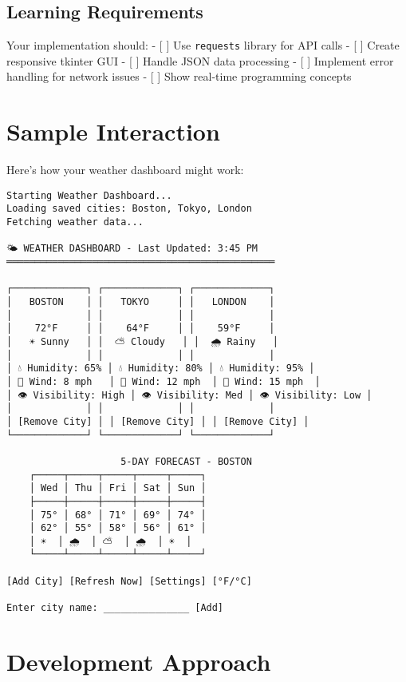 \documentclass[
  letterpaper,
  DIV=11,
  numbers=noendperiod,
  oneside]{scrreprt}
\begin{document}
\subsection{Learning Requirements}\label{learning-requirements-9}

Your implementation should: - {[} {]} Use \texttt{requests} library for
API calls - {[} {]} Create responsive tkinter GUI - {[} {]} Handle JSON
data processing - {[} {]} Implement error handling for network issues -
{[} {]} Show real-time programming concepts

\section{Sample Interaction}\label{sample-interaction-9}

Here's how your weather dashboard might work:

\begin{verbatim}
Starting Weather Dashboard...
Loading saved cities: Boston, Tokyo, London
Fetching weather data...

🌤️ WEATHER DASHBOARD - Last Updated: 3:45 PM
═══════════════════════════════════════════════

┌─────────────┐ ┌─────────────┐ ┌─────────────┐
│   BOSTON    │ │   TOKYO     │ │   LONDON    │
│             │ │             │ │             │
│    72°F     │ │    64°F     │ │    59°F     │
│   ☀️ Sunny   │ │  ⛅ Cloudy   │ │  🌧️ Rainy   │
│             │ │             │ │             │
│ 💧 Humidity: 65% │ 💧 Humidity: 80% │ 💧 Humidity: 95% │
│ 💨 Wind: 8 mph   │ 💨 Wind: 12 mph  │ 💨 Wind: 15 mph  │
│ 👁️ Visibility: High │ 👁️ Visibility: Med │ 👁️ Visibility: Low │
│             │ │             │ │             │
│ [Remove City] │ │ [Remove City] │ │ [Remove City] │
└─────────────┘ └─────────────┘ └─────────────┘

                    5-DAY FORECAST - BOSTON
    ┌─────┬─────┬─────┬─────┬─────┐
    │ Wed │ Thu │ Fri │ Sat │ Sun │
    ├─────┼─────┼─────┼─────┼─────┤
    │ 75° │ 68° │ 71° │ 69° │ 74° │
    │ 62° │ 55° │ 58° │ 56° │ 61° │
    │ ☀️  │ 🌧️  │ ⛅  │ 🌧️  │ ☀️  │
    └─────┴─────┴─────┴─────┴─────┘

[Add City] [Refresh Now] [Settings] [°F/°C]

Enter city name: _______________ [Add]
\end{verbatim}

\section{Development Approach}\label{development-approach-9}
\end{document}
